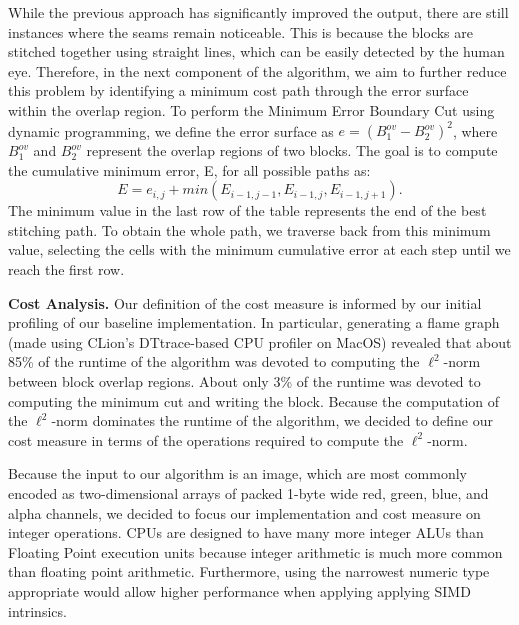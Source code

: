\documentclass[letterpaper]{article}
\newcommand{\mypar}[1]{{\bf #1.}}
\begin{document}
While the previous approach has significantly improved the output, there are still instances where the seams remain noticeable. This is because the blocks are stitched together using straight lines, which can be easily detected by the human eye. Therefore, in the next component of the algorithm, we aim to further reduce this problem by identifying a minimum cost path through the error surface within the overlap region. To perform the Minimum Error Boundary Cut using dynamic programming, we define the error surface as ${e = (B^{ov}_{1} - B^{ov}_{2})^{2}}$, where ${B^{ov}_{1}}$ and ${B^{ov}_{2}}$ represent the overlap regions of two blocks. The goal is to compute the cumulative minimum error, E, for all possible paths as:
\[ E = e_{i,j} + min(E_{i-1,j-1}, E_{i-1,j}, E_{i-1,j+1}). \]
The minimum value in the last row of the table represents the end of the best stitching path. To obtain the whole path, we traverse back from this minimum value, selecting the cells with the minimum cumulative error at each step until we reach the first row.

\mypar{Cost Analysis} Our definition of the cost measure is informed by our initial profiling of our baseline implementation. In particular, generating a flame graph (made using CLion's DTtrace-based CPU profiler on MacOS) revealed that about 85\% of the runtime of the algorithm was devoted to computing the $\ell ^2$-norm between block overlap regions. About only 3\% of the runtime was devoted to computing the minimum cut and writing the block. Because the computation of the $\ell ^2$-norm dominates the runtime of the algorithm, we decided to define our cost measure in terms of the operations required to compute the $\ell ^2$-norm.

Because the input to our algorithm is an image, which are most commonly encoded as two-dimensional arrays of packed 1-byte wide red, green, blue, and alpha channels, we decided to focus our implementation and cost measure on integer operations. CPUs are designed to have many more integer ALUs than Floating Point execution units because integer arithmetic is much more common than floating point arithmetic. Furthermore, using the narrowest numeric type appropriate would allow higher performance when applying applying SIMD intrinsics.
\end{document}

